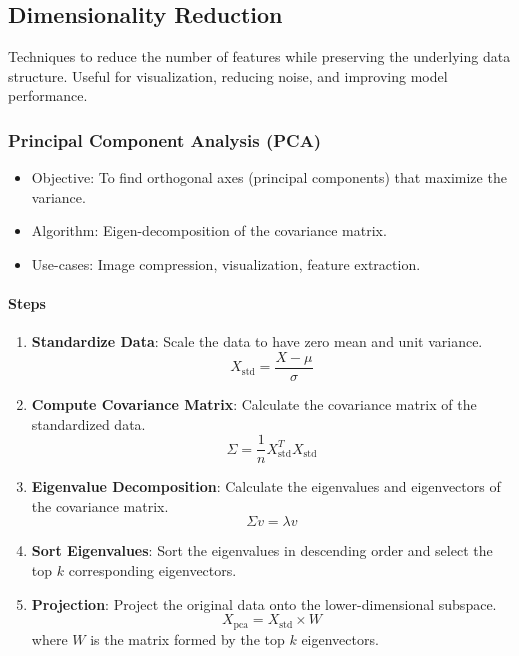 \documentclass[english, threecolumn]{latex4ei/latex4ei_sheet}
\begin{document}
\begin{sectionbox}
\subsection{Dimensionality Reduction}
Techniques to reduce the number of features while preserving the underlying data structure. Useful for visualization, reducing noise, and improving model performance.

\subsubsection{Principal Component Analysis (PCA)}
\begin{itemize}
    \item Objective: To find orthogonal axes (principal components) that maximize the variance.
    \item Algorithm: Eigen-decomposition of the covariance matrix.
    \item Use-cases: Image compression, visualization, feature extraction.
\end{itemize}

\paragraph{Steps}
\begin{enumerate}
    \item \textbf{Standardize Data}: Scale the data to have zero mean and unit variance.
    \[
    X_{\text{std}} = \frac{X - \mu}{\sigma}
    \]
    
    \item \textbf{Compute Covariance Matrix}: Calculate the covariance matrix of the standardized data.
    \[
    \Sigma = \frac{1}{n} X_{\text{std}}^T X_{\text{std}}
    \]
    
    \item \textbf{Eigenvalue Decomposition}: Calculate the eigenvalues and eigenvectors of the covariance matrix.
    \[
    \Sigma v = \lambda v
    \]
    
    \item \textbf{Sort Eigenvalues}: Sort the eigenvalues in descending order and select the top \(k\) corresponding eigenvectors.
    
    \item \textbf{Projection}: Project the original data onto the lower-dimensional subspace.
    \[
    X_{\text{pca}} = X_{\text{std}} \times W
    \]
    where \(W\) is the matrix formed by the top \(k\) eigenvectors.
\end{enumerate}


\end{sectionbox}
\end{document}
